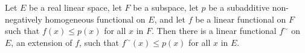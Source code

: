 Let $E$ be a real linear space, let $F$ be a subspace, let $p$ be a subadditive non-negatively homogeneous functional on $E$, and let $f$ be a linear functional on $F$ such that $f(x) \leq p(x)$ for all $x$ in $F$. Then there is a linear functional $f^{\sim}$ on $E$, an extension of $f$, such that $f^{\sim}(x) \leq p(x)$ for all $x$ in $E$.
